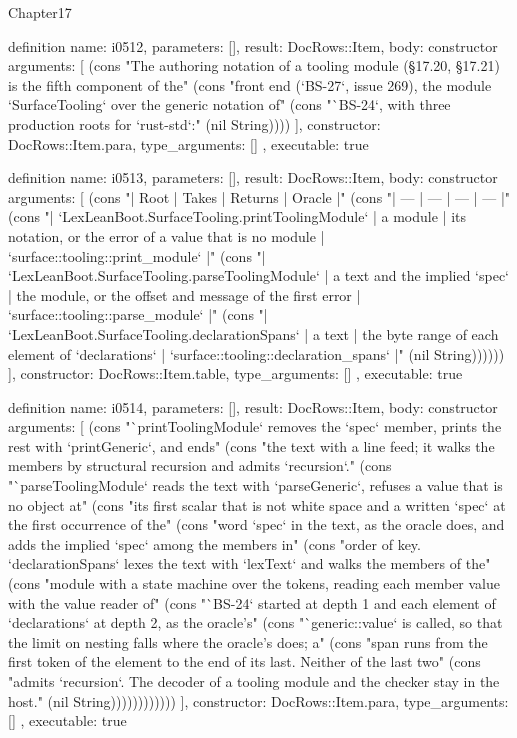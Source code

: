\begin{lexlean}{Chapter17}
\begin{semanticmodule}
definition{
  name: i0512,
  parameters: [],
  result: DocRows::Item,
  body: constructor{
    arguments: [
      (cons "The authoring notation of a tooling module (§17.20, §17.21) is the fifth component of the" (cons "front end (`BS-27`, issue 269), the module `SurfaceTooling` over the generic notation of" (cons "`BS-24`, with three production roots for `rust-std`:" (nil String))))
    ],
    constructor: DocRows::Item.para,
    type_arguments: []
  },
  executable: true
}

definition{
  name: i0513,
  parameters: [],
  result: DocRows::Item,
  body: constructor{
    arguments: [
      (cons "| Root | Takes | Returns | Oracle |" (cons "| --- | --- | --- | --- |" (cons "| `LexLeanBoot.SurfaceTooling.printToolingModule` | a module | its notation, or the error of a value that is no module | `surface::tooling::print_module` |" (cons "| `LexLeanBoot.SurfaceTooling.parseToolingModule` | a text and the implied `spec` | the module, or the offset and message of the first error | `surface::tooling::parse_module` |" (cons "| `LexLeanBoot.SurfaceTooling.declarationSpans` | a text | the byte range of each element of `declarations` | `surface::tooling::declaration_spans` |" (nil String))))))
    ],
    constructor: DocRows::Item.table,
    type_arguments: []
  },
  executable: true
}

definition{
  name: i0514,
  parameters: [],
  result: DocRows::Item,
  body: constructor{
    arguments: [
      (cons "`printToolingModule` removes the `spec` member, prints the rest with `printGeneric`, and ends" (cons "the text with a line feed; it walks the members by structural recursion and admits `recursion`." (cons "`parseToolingModule` reads the text with `parseGeneric`, refuses a value that is no object at" (cons "its first scalar that is not white space and a written `spec` at the first occurrence of the" (cons "word `spec` in the text, as the oracle does, and adds the implied `spec` among the members in" (cons "order of key. `declarationSpans` lexes the text with `lexText` and walks the members of the" (cons "module with a state machine over the tokens, reading each member value with the value reader of" (cons "`BS-24` started at depth 1 and each element of `declarations` at depth 2, as the oracle's" (cons "`generic::value` is called, so that the limit on nesting falls where the oracle's does; a" (cons "span runs from the first token of the element to the end of its last. Neither of the last two" (cons "admits `recursion`. The decoder of a tooling module and the checker stay in the host." (nil String))))))))))))
    ],
    constructor: DocRows::Item.para,
    type_arguments: []
  },
  executable: true
}


\end{semanticmodule}
\end{lexlean}
